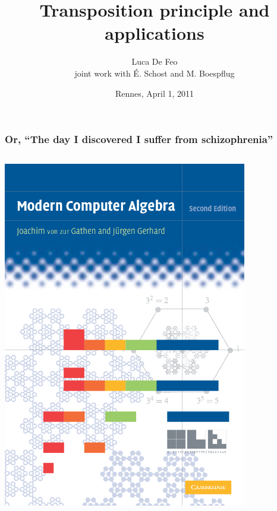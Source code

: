 \documentclass[10pt]{beamer}
\title{Transposition principle and applications}
\author[Luca De Feo]{Luca De Feo\\\small{joint work with É. Schost and M. Boespflug}}
\institute{IRMAR}
\date{Rennes, April 1, 2011}
\begin{document}
\begin{frame}
  \titlepage
\end{frame}


\begin{frame}
  \frametitle{Or, ``The day I discovered I suffer from schizophrenia''}

  \begin{columns}[c]
    \begin{column}{0.5\textwidth}
      \begin{center}
        \includegraphics[width=0.8\textwidth]{modern.png}


\end{center}
\end{column}
\end{columns}
\end{frame}
\end{document}
